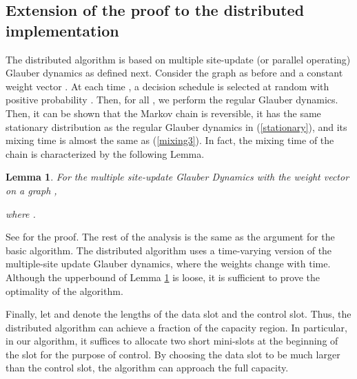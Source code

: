 \documentclass[10pt,onecolumn,draftclsnofoot,journal]{IEEEtran}
\newtheorem{lemma}{Lemma}
\begin{document}
\subsection*{Extension of the proof to the distributed implementation}
The distributed algorithm is based on multiple site-update (or parallel operating) Glauber dynamics as defined next. Consider the graph  as before and a constant weight vector . At each time , a decision schedule  is selected at random with positive probability . Then, for all , we perform the regular Glauber dynamics.
Then, it can be shown that the Markov chain is reversible, it has the same stationary distribution as the regular Glauber dynamics in (\ref{stationary}), and its mixing time is almost the same as (\ref{mixing3}). In fact, the mixing time of the chain is characterized by the following Lemma.
\begin{lemma}\label{multiple}
For the multiple site-update Glauber Dynamics with the weight vector  on a graph ,

where .
\end{lemma}
See \cite{ghaderi} for the proof. The rest of the analysis is the same as the argument for the basic algorithm.
The distributed algorithm uses a time-varying version of the multiple-site update Glauber dynamics, where the weights change with time. Although the upperbound of Lemma \ref{multiple} is loose, it is sufficient to prove the optimality of the algorithm.

Finally, let  and  denote the lengths of the data slot and the control slot. Thus, the distributed algorithm can achieve a fraction  of the capacity region. In particular, in our algorithm, it suffices to allocate two short mini-slots at the beginning of the slot for the purpose of control. By choosing the data slot to be much larger than the control slot, the algorithm can approach the full capacity.
\end{document}
